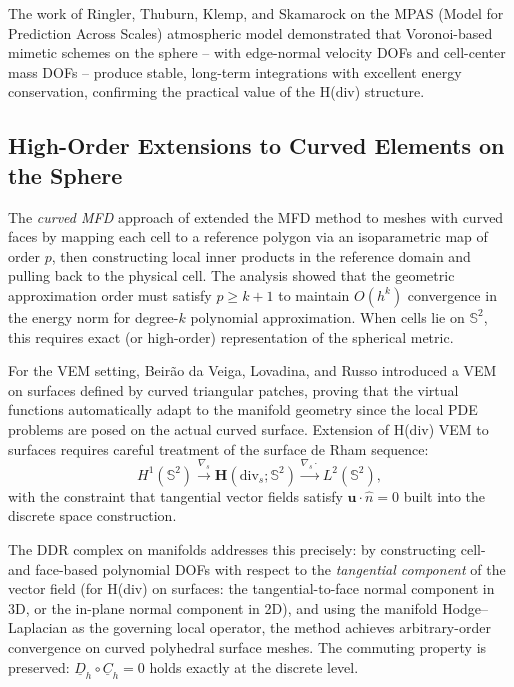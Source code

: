 The work of Ringler, Thuburn, Klemp, and Skamarock \cite{ringler2010unified}
on the MPAS (Model for Prediction Across Scales) atmospheric model
demonstrated that Voronoi-based mimetic schemes on the sphere -- with
edge-normal velocity DOFs and cell-center mass DOFs -- produce stable,
long-term integrations with excellent energy conservation, confirming the
practical value of the H(div) structure.

\subsection{High-Order Extensions to Curved Elements on the Sphere}

The \emph{curved MFD} approach of \cite{lipnikovCurvedMFD2023} extended the
MFD method to meshes with curved faces by mapping each cell to a reference
polygon via an isoparametric map of order $p$, then constructing local inner
products in the reference domain and pulling back to the physical cell.
The analysis showed that the geometric approximation order must satisfy
$p \geq k+1$ to maintain $O(h^k)$ convergence in the energy norm for
degree-$k$ polynomial approximation. When cells lie on $\mathbb{S}^2$,
this requires exact (or high-order) representation of the spherical metric.

For the VEM setting, Beir\~{a}o da Veiga, Lovadina, and Russo
\cite{veigaCurvedVEM2019} introduced a VEM on surfaces defined by curved
triangular patches, proving that the virtual functions automatically adapt
to the manifold geometry since the local PDE problems are posed on the
actual curved surface. Extension of H(div) VEM to surfaces requires
careful treatment of the surface de Rham sequence:
\[
  H^1(\mathbb{S}^2) \xrightarrow{\nabla_s}
  \mathbf{H}(\mathrm{div}_s;\mathbb{S}^2) \xrightarrow{\nabla_s\cdot}
  L^2(\mathbb{S}^2),
\]
with the constraint that tangential vector fields satisfy
$\mathbf{u}\cdot\hat{n}=0$ built into the discrete space construction.

The DDR complex on manifolds \cite{dipietroManifold2024} addresses this
precisely: by constructing cell- and face-based polynomial DOFs with
respect to the \emph{tangential component} of the vector field (for H(div)
on surfaces: the tangential-to-face normal component in 3D, or the
in-plane normal component in 2D), and using the manifold Hodge--Laplacian
as the governing local operator, the method achieves arbitrary-order
convergence on curved polyhedral surface meshes. The commuting property
is preserved: $\underline{D}_h \circ \underline{C}_h = 0$ holds exactly
at the discrete level.

